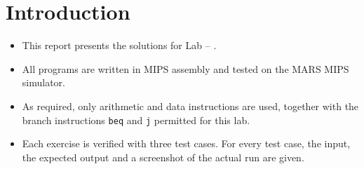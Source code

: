 \section{Introduction}
\begin{itemize}[itemsep=6pt]
  \item This report presents the solutions for Lab \LabNumber{} -- \textit{\LabTitle}.
  \item All programs are written in MIPS assembly and tested on the MARS MIPS simulator.
  \item As required, only arithmetic and data instructions are used, together with
        the branch instructions \texttt{beq} and \texttt{j} permitted for this lab.
  \item Each exercise is verified with three test cases. For every test case, the input,
        the expected output and a screenshot of the actual run are given.
\end{itemize}
